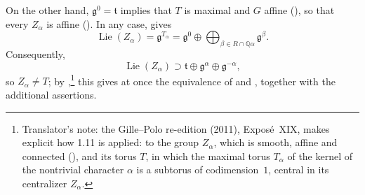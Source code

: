 On the other hand, \(\mathfrak g^{0}=\mathfrak t\) implies that \(T\) is
maximal and \(G\) affine (), so that every \(Z_{\alpha}\) is affine
().  In any case,
 gives
\[
  \operatorname{Lie}(Z_{\alpha})
  =
  \mathfrak g^{T_{\alpha}}
  =
  \mathfrak g^{0}
  \oplus
  \bigoplus_{\beta\in R\cap\mathbb Q\alpha}
    \mathfrak g^{\beta}.
\]
Consequently,
\[
  \operatorname{Lie}(Z_{\alpha})
  \supset
  \mathfrak t\oplus
  \mathfrak g^{\alpha}\oplus
  \mathfrak g^{-\alpha},
\]
so \(Z_{\alpha}\ne T\); by ,\footnote{Translator's note: the Gille--Polo re-edition (2011), Exposé~XIX, makes
explicit how 1.11 is applied: to the group \(Z_{\alpha}\), which is smooth,
affine and connected (), and its torus \(T\), in which the maximal
torus \(T_{\alpha}\) of the kernel of the nontrivial character \(\alpha\) is a
subtorus of codimension~\(1\), central in its centralizer \(Z_{\alpha}\).} this gives at once the equivalence of
 and , together with the additional assertions.

